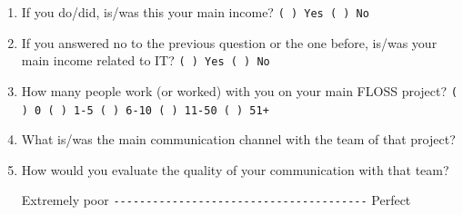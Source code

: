 \documentclass[lnbip]{svmultln}
\begin{document}
\begin{small}
\begin{enumerate}
  \item If you do/did, is/was this your main income?
    \verb=( ) Yes ( ) No= \vspace{8pt}

  \item If you answered no to the previous question or the one before,
    is/was your main income related to IT?  \verb=( ) Yes ( ) No=
    \vspace{8pt}

  \item How many people work (or worked) with you on your main FLOSS
    project?  \verb=( ) 0 ( ) 1-5 ( ) 6-10 ( ) 11-50 ( ) 51+=
    \vspace{8pt}

  \item What is/was the main communication channel with the team of
    that project?
    \vspace{8pt}

  \item How would you evaluate the quality of your communication with
    that team?

    Extremely poor \verb=---------------------------------------=
    Perfect \vspace{8pt}


\end{enumerate}
\end{small}
\end{document}

